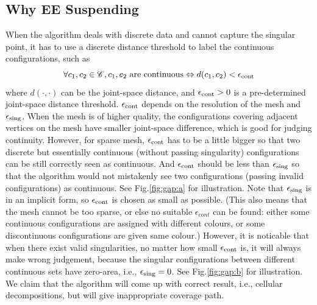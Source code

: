 \documentclass[Afour,sageh,times]{sagej}
\begin{document}
\subsection{Why EE Suspending}
When the algorithm deals with discrete data and cannot capture the singular point, it has to use a discrete distance threshold to label the continuous configurations, such as
\begin{equation}\label{equ_continuous}
\forall c_1, c_2\in \mathscr{C}, c_1, c_2\mbox{ are continuous}\Leftrightarrow d(c_1, c_2) < \epsilon_{\rm cont}
\end{equation}
where $d(\cdot, \cdot)$ can be the joint-space distance, and $\epsilon_{\rm cont} > 0$ is a pre-determined joint-space distance threshold. 
$\epsilon_{\rm cont}$ depends on the resolution of the mesh and $\epsilon_{\rm sing}$. 
When the mesh is of higher quality, the configurations covering adjacent vertices on the mesh have smaller joint-space difference, which is good for judging continuity. 
However, for sparse mesh, $\epsilon_{\rm cont}$ has to be a little bigger so that two discrete but essentially continuous (without passing singularity) configurations can be still correctly seen as continuous. 
And $\epsilon_{\rm cont}$ should be less than $\epsilon_{\rm sing}$ so that the algorithm would not mistakenly see two configurations (passing invalid configurations) as continuous. See Fig.\ref{fig:gap:a} for illustration. Note that $\epsilon_{\rm sing}$ is in an implicit form, so $\epsilon_{\rm cont}$ is chosen as small as possible. 
(This also means that the mesh cannot be too sparse, or else no suitable $\epsilon_{cont}$ can be found: either some continuous configurations are assigned with different colours, or some discontinuous configurations are given same colour.)
However, it is noticable that when there exist valid singularities, no matter how small $\epsilon_{\rm cont}$ is, it will always make wrong judgement, because the singular configurations between different continuous sets have zero-area, i.e., $\epsilon_{\rm sing} = 0$. See Fig.\ref{fig:gap:b} for illustration. 
We claim that the algorithm will come up with correct result, i.e., cellular decompositions, but will give inappropriate coverage path. 
\end{document}
